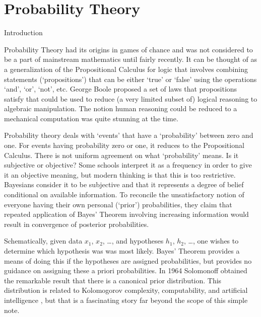 \chapter{Probability Theory}

\begin{section}{Introduction}

Probability Theory had its origins in games of
chance and was not considered to be a part of mainstream mathematics until
fairly recently. It can be thought of as a generalization of the Propositional
Calculus for logic that involves combining statements (`propositions') that 
can be either `true' or `false' using the operations `and', `or', `not', etc.
George Boole \cite{Boole:1853} proposed a set of laws that propositions satisfy that
could be used to reduce (a very limited subset of) logical reasoning to algebraic 
manipulation. The notion human reasoning could be reduced to a mechanical computation
was quite stunning at the time. 

Probability theory deals with `events' that have a `probability' between zero 
and one. For events having probability zero or one, it reduces to the Propositional
Calculus. There is not uniform agreement on what `probability' means.  Is it
subjective or objective? Some schools interpret it as a frequency in order to give
it an objective meaning, but modern thinking is that this is too restrictive.
Bayesians consider it to be subjective and that it represents a
degree of belief conditional on available information. To reconcile the 
unsatisfactory notion of everyone having their own personal (`prior') probabilities, 
they claim that repeated application of Bayes' Theorem involving increasing
information would result in convergence of posterior probabilities.






Schematically, given data $x_1$, $x_2$, \dots, and hypotheses $h_1$, $h_2$, \dots, one
wishes to determine which hypothesis was was most likely. Bayes' Theorem provides a
means of doing this if the hypotheses are assigned probabilities, but provides no
guidance on assigning these a priori probabilities. In 1964 Solomonoff \cite{Solomonoff:1964} 
obtained the remarkable result that there is a canonical prior distribution. 
This distribution is related to Kolomogorov complexity, computability, and artificial
intelligence \cite{AIT:2007}, but that is a fascinating story far beyond the scope of this simple note.


\end{section}

